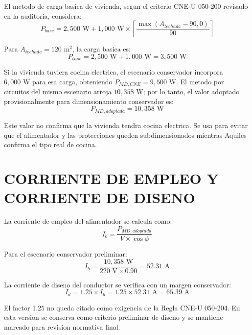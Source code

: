 El metodo de carga basica de vivienda, segun el criterio CNE-U 050-200 revisado en la auditoria, considera:
\begin{equation}
P_{base}=2,500\text{ W}+1,000\text{ W}\times
\left\lceil\frac{\max(A_{techada}-90,0)}{90}\right\rceil
\end{equation}

Para \(A_{techada}=120\text{ m}^2\), la carga basica es:
\begin{equation}
P_{base}=2,500\text{ W}+1,000\text{ W}=3,500\text{ W}
\end{equation}

Si la vivienda tuviera cocina electrica, el escenario conservador incorpora \(6,000\text{ W}\) para esa carga, obteniendo \(P_{MD,CNE}=9,500\text{ W}\). El metodo por circuitos del mismo escenario arroja \(10,358\text{ W}\); por lo tanto, el valor adoptado provisionalmente para dimensionamiento conservador es:
\begin{equation}
P_{MD,adoptada}=10,358\text{ W}
\end{equation}

Este valor no confirma que la vivienda tendra cocina electrica. Se usa para evitar que el alimentador y las protecciones queden subdimensionados mientras Aquiles confirma el tipo real de cocina.

\section{CORRIENTE DE EMPLEO Y CORRIENTE DE DISENO}

La corriente de empleo del alimentador se calcula como:
\begin{equation}
I_b=\frac{P_{MD,adoptada}}{V\times\cos\phi}
\end{equation}

Para el escenario conservador preliminar:
\begin{equation}
I_b=\frac{10,358\text{ W}}{220\text{ V}\times0.90}=52.31\text{ A}
\end{equation}

La corriente de diseno del conductor se verifica con un margen conservador:
\begin{equation}
I_d=1.25\times I_b=1.25\times52.31\text{ A}=65.39\text{ A}
\end{equation}

El factor \(1.25\) no queda citado como exigencia de la Regla CNE-U 050-204. En esta version se conserva como criterio preliminar de diseno y se mantiene marcado para revision normativa final.


